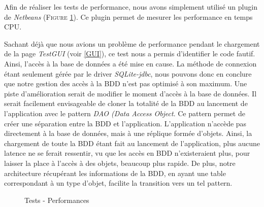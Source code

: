 Afin de réaliser les tests de performance, nous avons simplement utilisé un plugin de \textit{Netbeans} (\textsc{Figure} \ref{perf}). Ce plugin permet de mesurer les performance en temps CPU.

Sachant déjà que nous avions un problème de performance pendant le chargement de la page \textit{TestGUI} (voir \ref{GUI}), ce test nous a permis d'identifier le code fautif.
Ainsi, l'accès à la base de données a été mise en cause. La méthode de connexion étant seulement gérée par le driver \textit{SQLite-jdbc}, nous pouvons donc en conclure que notre gestion des accès à la BDD n'est pas optimisé à son maximum.
Une piste d'amélioration serait de modifier le moment d'accès à la base de données. Il serait facilement envisageable de cloner la totalité de la BDD au lancement de l'application avec le pattern \textit{DAO (Data Access Object}. Ce pattern permet de créer une séparation entre la BDD et l'application. L'application n'accède pas directement à la base de données, mais à une réplique formée d'objets.
Ainsi, la chargement de toute la BDD étant fait au lancement de l'application, plus aucune latence ne se ferait ressentir, vu que les accès en BDD n'existeraient plus, pour laisser la place à l'accès à des objets, beaucoup plus rapide.
De plus, notre architecture récupérant les informations de la BDD, en ayant une table correspondant à un type d'objet, facilite la transition vers un tel pattern.

\begin{figure}[!ht]
\begin{center}
  \caption{Tests - Performances}
  \label{perf} 
\end{center}
\end{figure}






